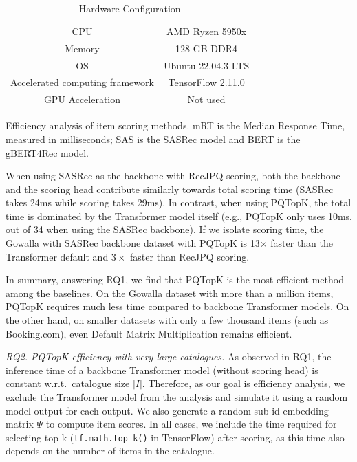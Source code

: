\documentclass[sigconf,natbib=true, review=False]{acmart} %
\newcommand{\rsasha}[1]{\textcolor[HTML]{000000}{#1}}
\newcommand{\gsasha}[1]{\textcolor[HTML]{000000}{#1}}
\newcommand{\scr}[1]{\textcolor[HTML]{000000}{#1}}
\begin{document}
\begin{table}[tb]
    \centering
    \caption{Hardware Configuration}
    \begin{tabular}{c|c}
        \toprule
         CPU & AMD Ryzen 5950x  \\
         Memory & 128 GB DDR4 \\ 
         OS & Ubuntu 22.04.3 LTS  \\
         Accelerated computing framework & TensorFlow 2.11.0 \\
         GPU Acceleration & Not used\\
         \bottomrule
    \end{tabular}
    \label{tb:hardware}
\end{table}



\begin{table}
\caption{Efficiency analysis of item scoring methods. mRT is the Median Response Time, measured in milliseconds; SAS is the SASRec model and BERT is the gBERT4Rec model.} \label{tb:main}
\vspace{-1\baselineskip}

\end{table}

 When using  \gsasha{SASRec as the backbone with RecJPQ scoring}, both \gsasha{the backbone and the scoring head} contribute \gsasha{similarly} towards total scoring time (SASRec takes 24ms while scoring takes 29ms). \rsasha{In contrast}, when using PQTopK, the total time \rsasha{is dominated by} the Transformer model itself (e.g., PQTopK only uses 10\gsasha{ms.}  out of 34 when using the SASRec backbone). If we isolate scoring time, the Gowalla with SASRec backbone dataset with  PQTopK is 13$\times$ faster than the Transformer default and $3\times$ faster than RecJPQ scoring.

In summary, answering RQ1, we find that PQTopK is the most efficient method among the baselines. \rsasha{On the Gowalla dataset with more than a million items, PQTopK} requires much less time compared to backbone Transformer models. On the other hand, on smaller datasets with only a few thousand items (such as Booking.com), even Default Matrix Multiplication remains efficient. 


\textit{RQ2. PQTopK efficiency with very large catalogues.} As observed in RQ1, the inference time of a backbone Transformer model (without scoring head) is constant \rsasha{w.r.t.\ catalogue size $|I|$}. Therefore, as our goal is efficiency analysis, we exclude the Transformer model from the analysis and simulate it using a random model output for each output. \scr{We also generate} a random sub-id embedding matrix $\Psi$ to compute item scores. In all cases, we include the time required for selecting top-k (\rsasha{\texttt{tf.math.top\_k()} in TensorFlow}) after scoring, as this time also depends on the number of items in the catalogue. 
\end{document}
